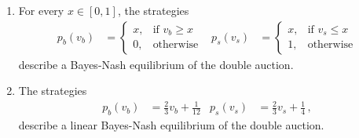 \begin{theorem}
\label{thm:auc:double}
\begin{enumerate}
 \item For every $x \in [0,1]$, the strategies
 \begin{align*}
   p_b(v_b) &= \begin{cases} x, &\text{if } v_b \geq x \\ 0, &\text{otherwise}
   \end{cases}
   &
   p_s(v_s) &= \begin{cases} x, &\text{if } v_s \leq x \\ 1, &\text{otherwise} \end{cases}
 \end{align*}
 describe a Bayes-Nash equilibrium of the double auction.
 \item The strategies
  \begin{align*}
   p_b(v_b) &= \frac{2}{3} v_b + \frac{1}{12} &
   p_s(v_s) &= \frac{2}{3} v_s + \frac{1}{4}\,,
  \end{align*}
  describe a linear Bayes-Nash equilibrium of the double auction.
\end{enumerate}
\end{theorem}

